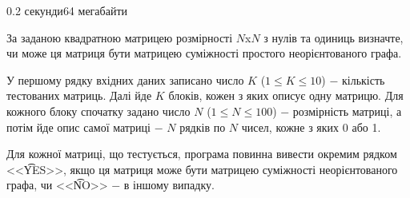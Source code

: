 \begin{problem}{}{}{}{0.2 секунди}{64 мегабайти}

За заданою квадратною матрицею розмірності $N$x$N$ з нулів та одиниць визначте,  
чи може ця матриця бути матрицею суміжності простого неорієнтованого графа.

\InputFile
У першому рядку вхідних даних записано число $K$ ($1 \le K \le 10$) $-$ кількість тестованих матриць. Далі йде $K$
блоків, кожен з яких описує одну матрицю. Для кожного блоку спочатку задано число $N$ ($1 \le N \le 100$) $-$ 
розмірність матриці, а потім йде опис самої матриці $-$ $N$ рядків по $N$ чисел, кожне з яких 0 або 1.

\OutputFile
Для кожної матриці, що тестується, програма повинна вивести окремим рядком <<{\t{YES}}>>, якщо ця матриця 
може бути матрицею суміжності неорієнтованого графа, чи <<{\t{NO}}>> $-$ в іншому випадку.

\Example

\begin{example}
%
\end{example}

\end{problem}
